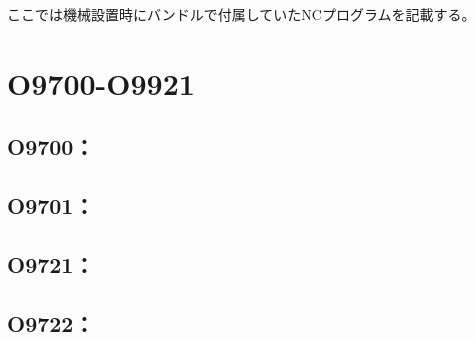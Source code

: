 
ここでは機械設置時にバンドルで付属していたNCプログラムを記載する。


\section{O9700-O9921}

\subsection{O9700：}



\clearpage
\subsection{O9701：}



\clearpage
\subsection{O9721：}



\clearpage
\subsection{O9722：}



